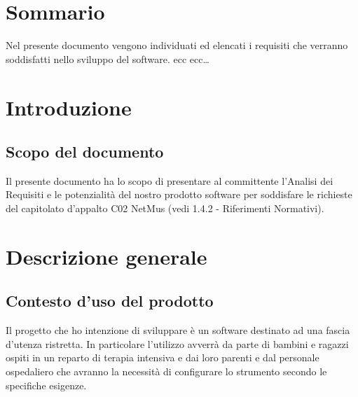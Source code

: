 \newcommand{\nomedoc}{Analisi Dei Requisiti}
\newcommand{\versione}{1.0}
\newcommand{\nomefile}{AnalisiDeiRequisiti-\versione.pdf}
\newcommand{\datacreazione}{6 Giugno 2011}
\newcommand{\datamodifica}{6 Giugno 2011}
\newcommand{\redazione}{Baron Federico}







\chapter*{Sommario}
\thispagestyle{fancy}
Nel presente documento vengono individuati ed elencati i requisiti che verranno
soddisfatti nello sviluppo del software. ecc ecc\ldots

\tableofcontents

\chapter{Introduzione}
\thispagestyle{fancy} %

\section{Scopo del documento}
Il presente documento ha lo scopo di presentare al committente l'Analisi dei
Requisiti e le potenzialit\`a del nostro prodotto software per soddisfare le
richieste del capitolato d'appalto C02 NetMus (vedi 1.4.2 - Riferimenti
Normativi).



\chapter{Descrizione generale}
\thispagestyle{fancy}

\section{Contesto d'uso del prodotto}
Il progetto che ho intenzione di sviluppare \`e un software
destinato ad una fascia d'utenza ristretta. In particolare l'utilizzo avverrà da
parte di bambini e ragazzi ospiti in un reparto di terapia intensiva e dai loro
parenti e dal personale ospedaliero che avranno la necessità di configurare lo
strumento secondo le specifiche esigenze.

